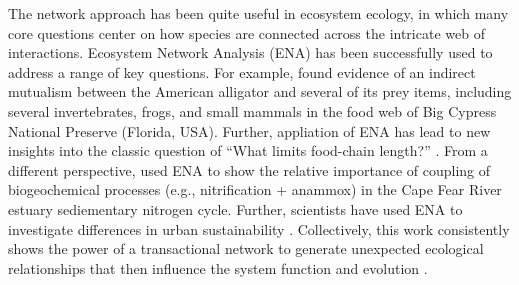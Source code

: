 


The network approach has been quite useful in ecosystem ecology, in
which many core questions center on how species are connected across
the intricate web of interactions.  Ecosystem Network Analysis (ENA)
has been successfully used to address a range of key questions.  For
example, \citet{bondavalli1999} found evidence of an indirect
mutualism between the American alligator and several of its prey
items, including several invertebrates, frogs, and small mammals in
the food web of Big Cypress National Preserve (Florida, USA).
Further, appliation of ENA has lead to new insights into the classic
question of ``What limits food-chain length?'' \citep{ulanowicz2014}.
From a different perspective, \citep{hines12} used ENA to show the
relative importance of coupling of biogeochemical processes (e.g.,
nitrification + anammox) in the Cape Fear River estuary sediementary
nitrogen cycle.  Further, scientists have used ENA to investigate
differences in urban sustainability \citep{bodini02, zhang10_ecomod,
  chen12, bodini2012cities}.  Collectively, this work consistently
shows the power of a transactional network to generate unexpected
ecological relationships that then influence the system function and
evolution \citep{ulanowicz97, patten91, jorgensen07_newecology}.

